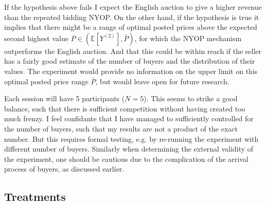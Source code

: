 \documentclass[a4paper,12pt]{article}
\begin{document}
	If the hypothesis above fails I expect the English auction to give a higher revenue than the repeated bidding NYOP. On the other hand, if the hypothesis is true it implies that there might be a range of optimal posted prices above the expected second highest value $P \in (\mathbb{E}[Y^{(2)}], \bar{P})$, for which the NYOP mechanism outperforms the English auction. And that this could be within reach if the seller has a fairly good estimate of the number of buyers and the distribution of their values. The experiment would provide no information on the upper limit on this optimal posted price range $\bar{P}$, but would leave open for future research.
	
	Each session will have 5 participants ($N=5$). This seems to strike a good balance, such that there is sufficient competition without having created too much frenzy. I feel confidante that I have managed to sufficiently controlled for the number of buyers, such that my results are not a product of the exact number. But this requires formal testing, e.g. by re-running the experiment with different number of buyers. Similarly when determining the external validity of the experiment, one should be cautious due to the complication of the arrival process of buyers, as discussed earlier.

	\subsection{Treatments}
	\label{sec:treatments}
\end{document}
